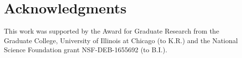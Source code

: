 \documentclass[fleqn,10pt,lineno]{wlpeerj}
\begin{document}
{%
\section*{Acknowledgments}

This work was supported by the Award for Graduate Research from the Graduate College, University of Illinois at Chicago (to K.R.) and the National Science Foundation grant NSF-DEB-1655692 (to B.I.).

\clearpage
%








}
\end{document}
